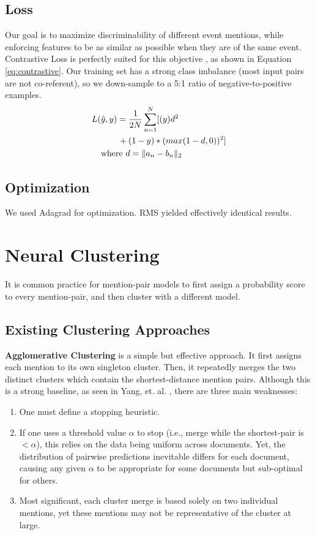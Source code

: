 \documentclass[11pt,a4paper]{article}
\begin{document}
\subsection{Loss}
Our goal is to maximize discriminability of different event mentions, while enforcing features to be as similar as possible when they are of the same event.  Contrastive Loss is perfectly suited for this objective \cite{SchroffKP15,pmlr-v48-liud16}, as shown in Equation \ref{eq:contrastive}. Our training set has a strong class imbalance (most input pairs are not co-referent), so we down-sample to a 5:1 ratio of negative-to-positive examples.
\begin{equation}
\begin{aligned}
L(&\hat{y},y)=\frac{1}{2N}\sum_{n=1}^{N}[(y)d^2 \\
&\qquad {} + (1-y)*(max(1-d,0))^2] \\
&\textnormal{where }d=\|a_{n}-b_{n}\|_{2}
\end{aligned}
\label{eq:contrastive}
\end{equation}

\subsection{Optimization}
We used Adagrad for optimization. RMS yielded effectively identical results.

\section{Neural Clustering}
\label{sec:clustering}
It is common practice for mention-pair models to first assign a probability score to every mention-pair, and then cluster with a different model.

\subsection{Existing Clustering Approaches}
\textbf{Agglomerative Clustering} is a simple but effective approach.  It first assigns each mention to its own singleton cluster.  Then, it repeatedly merges the two distinct clusters which contain the shortest-distance mention pairs.  Although this is a strong baseline, as seen in Yang, et. al. , there are three main weaknesses:
\begin{enumerate}
\item One must define a stopping heuristic.
\item If one uses a threshold value $\alpha$ to stop (i.e., merge while the shortest-pair is $<\alpha$), this relies on the data being uniform across documents. Yet, the distribution of pairwise predictions inevitable differs for each document, causing any given $\alpha$ to be appropriate for some documents but sub-optimal for others.
\item Most significant, each cluster merge is based solely on two individual mentions, yet these mentions may not be representative of the cluster at large.
\end{enumerate}
\end{document}
